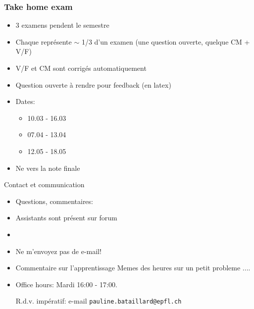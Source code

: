     \begin{frame}
     \frametitle{Take home exam} 
     \begin{itemize}
     \item 3 examens  pendent le semestre
     \item Chaque représente $∼$ 1/3 d'un examen (une question ouverte, quelque CM + V/F)
     \item V/F et CM sont corrigés automatiquement
     \item Question ouverte à rendre pour feedback (en latex)   
     \item Dates:
       \begin{itemize}
       \item 10.03 - 16.03
       \item 07.04 - 13.04
       \item 12.05 - 18.05
       \end{itemize}
     \item Ne  vers la note finale 
     \end{itemize}
   \end{frame}

   \begin{frame}{Contact et communication}

     \begin{itemize}
     \item Questions, commentaires: 
     \item Assistants sont présent sur forum 
     \item {} 
     \item Ne m'envoyez pas de  e-mail!
       \item Commentaire sur l'apprentissage Memes des heures sur un petit probleme .... 
     \item Office hours: Mardi 16:00 - 17:00.

       
      R.d.v. impératif: e-mail  {\tt pauline.bataillard@epfl.ch  }
     \end{itemize}
     
   \end{frame}


